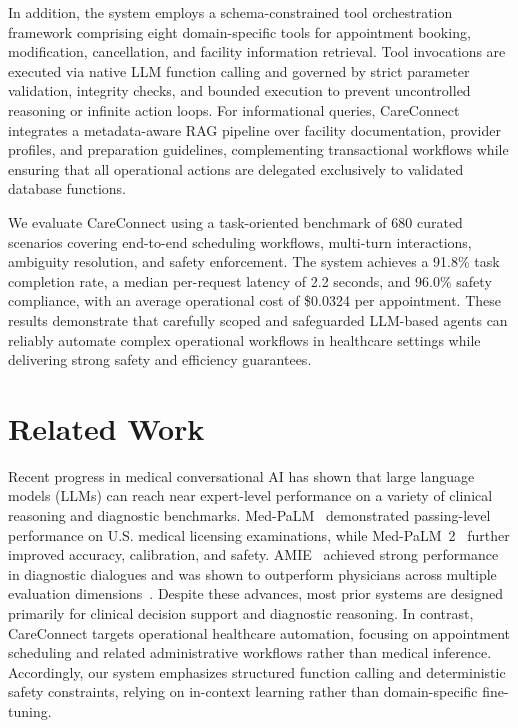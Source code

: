 \documentclass[conference]{IEEEtran}
\begin{document}
In addition, the system employs a schema-constrained tool orchestration framework comprising eight domain-specific tools for appointment booking, modification, cancellation, and facility information retrieval. Tool invocations are executed via native LLM function calling and governed by strict parameter validation, integrity checks, and bounded execution to prevent uncontrolled reasoning or infinite action loops. For informational queries, CareConnect integrates a metadata-aware RAG pipeline over facility documentation, provider profiles, and preparation guidelines, complementing transactional workflows while ensuring that all operational actions are delegated exclusively to validated database functions.

We evaluate CareConnect using a task-oriented benchmark of 680 curated scenarios covering end-to-end scheduling workflows, multi-turn interactions, ambiguity resolution, and safety enforcement. The system achieves a 91.8\% task completion rate, a median per-request latency of 2.2 seconds, and 96.0\% safety compliance, with an average operational cost of \$0.0324 per appointment. These results demonstrate that carefully scoped and safeguarded LLM-based agents can reliably automate complex operational workflows in healthcare settings while delivering strong safety and efficiency guarantees.

\section{Related Work}

Recent progress in medical conversational AI has shown that large language models (LLMs) can reach near expert-level performance on a variety of clinical reasoning and diagnostic benchmarks. Med-PaLM~\cite{singhal2023large} demonstrated passing-level performance on U.S. medical licensing examinations, while Med-PaLM~2~\cite{singhal2025toward} further improved accuracy, calibration, and safety. AMIE~\cite{tu2025towards} achieved strong performance in diagnostic dialogues and was shown to outperform physicians across multiple evaluation dimensions~\cite{gorenshtein2025ai}. Despite these advances, most prior systems are designed primarily for clinical decision support and diagnostic reasoning. In contrast, CareConnect targets operational healthcare automation, focusing on appointment scheduling and related administrative workflows rather than medical inference. Accordingly, our system emphasizes structured function calling and deterministic safety constraints, relying on in-context learning rather than domain-specific fine-tuning.
\end{document}
